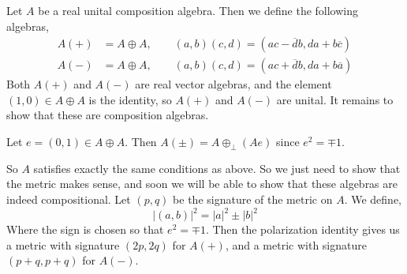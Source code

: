 \begin{defn}
Let $A$ be a real unital composition algebra. Then we define the following algebras,
\begin{align*}
    A(+) &= A\oplus A,\qquad (a,b)(c,d) = (ac-\overline{d}b,da+b\overline{c})\\
    A(-) &= A\oplus A,\qquad (a,b)(c,d) = (ac+\overline{d}b,da+b\overline{a})
\end{align*}
Both $A(+)$ and $A(-)$ are real vector algebras, and the element $(1,0)\in A \oplus A$ is the identity, so $A(+)$ and $A(-)$ are unital. It remains to show that these are composition algebras.
\end{defn}
Let $e = (0,1) \in A\oplus A$. Then $A(\pm) = A\oplus_\perp (Ae)$ since $e^2 = \mp 1$.

So $A$ satisfies exactly the same conditions as above. So we just need to show that the metric makes sense, and soon we will be able to show that these algebras are indeed compositional. Let $(p,q)$ be the signature of the metric on $A$. We define,
    \[|(a,b)|^2 = |a|^2 \pm |b|^2\]
Where the sign is chosen so that $e^2 = \mp 1$. Then the polarization identity gives us a metric with signature $(2p,2q)$ for $A(+)$, and a metric with signature $(p+q,p+q)$ for $A(-)$. 

